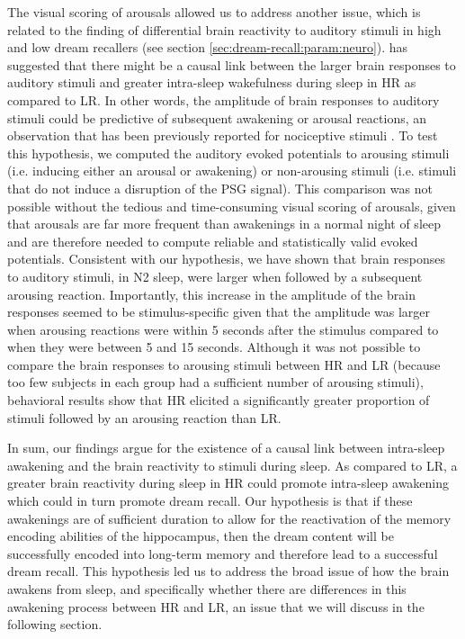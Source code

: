 The visual scoring of arousals allowed us to address another issue, which is related to the finding of differential brain reactivity to auditory stimuli in high and low dream recallers (see section \ref{sec:dream-recall:param:neuro}). \citet{eichenlaub_brain_2014} has suggested that there might be a causal link between the larger brain responses to auditory stimuli and greater intra-sleep wakefulness during sleep in HR as compared to LR. In other words, the amplitude of brain responses to auditory stimuli could be predictive of subsequent awakening or arousal reactions, an observation that has been previously reported for nociceptive stimuli \citet{bastuji_laser_2008}. To test this hypothesis, we computed the auditory evoked potentials to arousing stimuli (i.e. inducing either an arousal or awakening) or non-arousing stimuli (i.e. stimuli that do not induce a disruption of the PSG signal). This comparison was not possible without the tedious and time-consuming visual scoring of arousals, given that arousals are far more frequent than awakenings in a normal night of sleep and are therefore needed to compute reliable and statistically valid evoked potentials. Consistent with our hypothesis, we have shown that brain responses to auditory stimuli, in N2 sleep, were larger when followed by a subsequent arousing reaction. Importantly, this increase in the amplitude of the brain responses seemed to be stimulus-specific given that the amplitude was larger when arousing reactions were within 5 seconds after the stimulus compared to when they were between 5 and 15 seconds. Although it was not possible to compare the brain responses to arousing stimuli between HR and LR (because too few subjects in each group had a sufficient number of arousing stimuli), behavioral results show that HR elicited a significantly greater proportion of stimuli followed by an arousing reaction than LR.

In sum, our findings argue for the existence of a causal link between intra-sleep awakening and the brain reactivity to stimuli during sleep. As compared to LR, a greater brain reactivity during sleep in HR could promote intra-sleep awakening which could in turn promote dream recall. Our hypothesis is that if these awakenings are of sufficient duration to allow for the reactivation of the memory encoding abilities of the hippocampus, then the dream content will be successfully encoded into long-term memory and therefore lead to a successful dream recall. This hypothesis led us to address the broad issue of how the brain awakens from sleep, and specifically whether there are differences in this awakening process between HR and LR, an issue that we will discuss in the following section.


